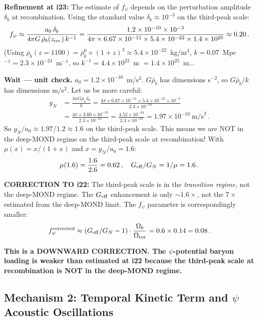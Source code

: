 \documentclass[11pt]{article}
\newcommand{\ee}[1]{\times 10^{#1}}
\newcommand{\Geff}{G_{\rm eff}}
\newcommand{\aM}{a_0}
\newcommand{\rhob}{\bar{\rho}_b}
\newcommand{\Ob}{\Omega_b}
\begin{document}
\textbf{Refinement at i23:}  The estimate of $f_\psi$ depends on the
perturbation amplitude $\delta_b$ at recombination.  Using the standard
value $\delta_b \approx 10^{-3}$ on the third-peak scale:
\begin{equation}
f_\psi \approx \frac{\aM\,\delta_b}{4\pi G\,\rhob(z_{\rm rec})\,k^{-1}}
= \frac{1.2\ee{-10}\times 10^{-3}}
{4\pi\times 6.67\ee{-11}\times 5.4\ee{-22}\times 1.4\ee{25}}
\approx 0.20\,.
\end{equation}
(Using $\rhob(z=1100) = \rhob^0 \times (1+z)^3 \approx 5.4\ee{-22}$~kg/m$^3$,
$k = 0.07$~Mpc$^{-1} = 2.3\ee{-24}$~m$^{-1}$, so $k^{-1} = 4.4\ee{23}$~m
$= 1.4\ee{25}$~m...

\textbf{Wait --- unit check.}  $\aM = 1.2\ee{-10}$~m/s$^2$.  $G\rhob$
has dimensions s$^{-2}$, so $G\rhob/k$ has dimensions m/s$^2$.
Let us be more careful:
\begin{align}
g_N &= \frac{4\pi G\rhob\,\delta_b}{k}
= \frac{4\pi\times 6.67\ee{-11}\times 5.4\ee{-22}\times 10^{-3}}
{2.3\ee{-24}}
\nonumber\\
&= \frac{4\pi\times 3.60\ee{-35}}{2.3\ee{-24}}
= \frac{4.52\ee{-34}}{2.3\ee{-24}}
= 1.97\ee{-10}~\text{m/s}^2\,.
\end{align}
So $g_N/\aM \approx 1.97/1.2 \approx 1.6$ on the third-peak scale.
This means we are NOT in the deep-MOND regime on the third-peak scale
at recombination!  With $\mu(x) = x/(1+x)$ and $x = g_N/\aM = 1.6$:
\begin{equation}
\mu(1.6) = \frac{1.6}{2.6} = 0.62\,,
\quad
\Geff/G_N = 1/\mu = 1.6\,.
\end{equation}

\textbf{CORRECTION TO i22:}  The third-peak scale is in the
\emph{transition regime}, not the deep-MOND regime.  The $\Geff$
enhancement is only $\sim 1.6\times$, not the $7\times$ estimated
from the deep-MOND limit.  The $f_\psi$ parameter is correspondingly
smaller:
\begin{equation}
f_\psi^{\rm corrected} \approx (\Geff/G_N - 1)\cdot\frac{\Ob}{\Omega_{\rm tot}}
= 0.6 \times 0.14 = 0.08\,.
\end{equation}

\textbf{This is a DOWNWARD CORRECTION.  The $\psi$-potential baryon
loading is weaker than estimated at i22 because the third-peak scale
at recombination is NOT in the deep-MOND regime.}

\subsection{Mechanism 2: Temporal Kinetic Term and $\psi$ Acoustic Oscillations}
\end{document}
